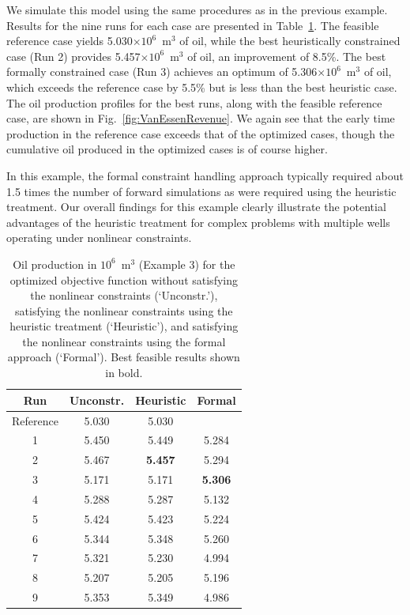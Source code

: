 \documentclass[twocolumn,numbook]{svjour3}          %
\begin{document}
We simulate this model using the same procedures as in the previous example.
Results for the nine runs for each case are presented in
Table~\ref{table:vanessen}. The feasible reference case yields 5.030$\times 10^6$~m$^3$ of
oil, while the best heuristically constrained case (Run 2) provides 5.457$\times 10^6$~m$^3$
of oil, an improvement of 8.5\%. The best formally constrained case (Run 3)
achieves an optimum of 5.306$\times 10^6$~m$^3$ of oil, which exceeds the reference case by
5.5\% but is less than the best heuristic case. The oil production profiles
for the best runs, along with the feasible reference case, are shown in
Fig.~\ref{fig:VanEssenRevenue}. We again see that the early time production in
the reference case exceeds that of the optimized cases, though the cumulative
oil produced in the optimized cases is of course higher. 

In this example, the formal constraint handling approach typically required about 1.5 times the
number of forward simulations as were required using the heuristic treatment.
Our overall findings for this example clearly illustrate the potential
advantages of the heuristic treatment for complex problems with multiple wells
operating under nonlinear constraints.




\begin{table}
\centering
\caption{Oil production in $10^6$~m$^3$ (Example 3) for the optimized objective function
         without satisfying the nonlinear constraints (`Unconstr.'), satisfying the nonlinear constraints
         using the heuristic treatment (`Heuristic'), and satisfying the nonlinear constraints
         using the formal approach (`Formal'). Best feasible results shown in bold.}
\begin{tabular}{|c|c|c|c|}
\hline
 Run              & Unconstr. & Heuristic & Formal     \\
\hline
Reference         & 5.030 &  5.030    &          \\
1 & 5.450 &  5.449   &  5.284   \\
2 & 5.467 &\bf{5.457} &  5.294   \\
3 & 5.171 &  5.171   &\bf{5.306}\\
4 & 5.288 &  5.287   &  5.132   \\
5 & 5.424 &  5.423   &  5.224   \\
6 & 5.344 &  5.348   &  5.260   \\
7 & 5.321 &  5.230   &  4.994   \\
8 & 5.207 &  5.205   &  5.196   \\
9 & 5.353 &  5.349   &  4.986   \\
\hline
\end{tabular}
  \label{table:vanessen}
\end{table}
\end{document}
